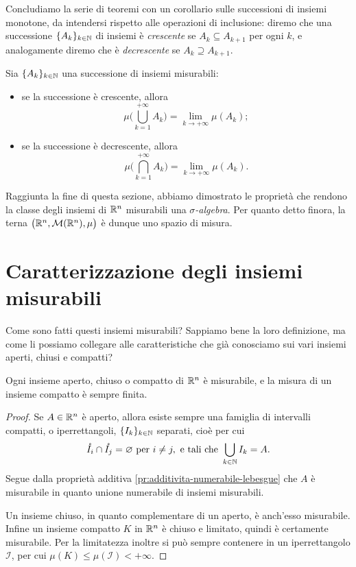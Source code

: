 Concludiamo la serie di teoremi con un corollario sulle successioni di insiemi monotone, da intendersi rispetto alle operazioni di inclusione: diremo che una successione $\{A_k\}_{k\in\mathbb{N}}$ di insiemi è \emph{crescente} se $A_k\subseteq A_{k+1}$ per ogni $k$, e analogamente diremo che è \emph{decrescente} se $A_k\supseteq A_{k+1}$.
\begin{corollario} \label{cor:misura-successioni-insiemi}
	Sia $\{A_k\}_{k\in\mathbb{N}}$ una successione di insiemi misurabili:
	\begin{itemize}
		\item se la successione è crescente, allora
			\begin{equation}
				\mu\bigg(\bigcup_{k=1}^{+\infty}A_k\bigg)=\lim_{k\to+\infty}\mu(A_k);
			\end{equation}
		\item se la successione è decrescente, allora
			\begin{equation}
				\mu\bigg(\bigcap_{k=1}^{+\infty}A_k\bigg)=\lim_{k\to+\infty}\mu(A_k).
			\end{equation}
	\end{itemize}
\end{corollario}

Raggiunta la fine di questa sezione, abbiamo dimostrato le proprietà che rendono la classe degli insiemi di $\mathbb{R}^n$ misurabili una \emph{$\sigma$-algebra}.
Per quanto detto finora, la terna $\big(\mathbb{R}^n,\mathcal M(\mathbb{R}^n),\mu\big)$ è dunque uno spazio di misura.

\section{Caratterizzazione degli insiemi misurabili}
\label{sec:caratterizzazione-insiemi-misurabili}
Come sono fatti questi insiemi misurabili? Sappiamo bene la loro definizione, ma come li possiamo collegare alle caratteristiche che già conosciamo sui vari insiemi aperti, chiusi e compatti?
\begin{teorema}
	Ogni insieme aperto, chiuso o compatto di $\mathbb{R}^n$ è misurabile, e la misura di un insieme compatto è sempre finita.
\end{teorema}
\begin{proof}
	Se $A\in\mathbb{R}^n$ è aperto, allora esiste sempre una famiglia di intervalli compatti, o iperrettangoli, $\{I_k\}_{k\in\mathbb{N}}$ separati, cioè per cui
	\begin{equation*}
		\mathring{I_i}\cap\mathring{I_j}=\varnothing\text{ per }i\neq j,\text{ e tali che }\bigcup_{k\in\mathbb{N}}I_k=A.
	\end{equation*}
	Segue dalla proprietà additiva \ref{pr:additivita-numerabile-lebesgue} che $A$ è misurabile in quanto unione numerabile di insiemi misurabili.

	Un insieme chiuso, in quanto complementare di un aperto, è anch'esso misurabile.
	Infine un insieme compatto $K$ in $\mathbb{R}^n$ è chiuso e limitato, quindi è certamente misurabile.
	Per la limitatezza inoltre si può sempre contenere in un iperrettangolo $\mathcal I$, per cui $\mu(K)\leq\mu(\mathcal I)<+\infty$.
\end{proof}

